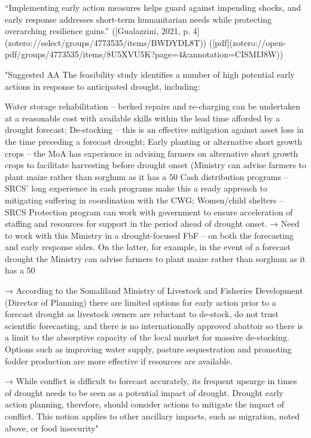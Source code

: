 {{“Implementing early action measures helps guard against impending shocks, and early response addresses short-term humanitarian needs while protecting overarching resilience gains.” ([Gualazzini, 2021, p. 4](zotero://select/groups/4773535/items/BWDYDL8T)) ([pdf](zotero://open-pdf/groups/4773535/items/8U5XVU5K?page=4&annotation=CISMIJ8W))








"Suggested AA
The feasibility study identifies a number of high potential early actions in response to anticipated drought, including:

Water storage rehabilitation – berked repairs and re-charging can be undertaken at a reasonable cost with available skills within the lead time afforded by a drought forecast;
De-stocking – this is an effective mitigation against asset loss in the time preceding a forecast drought;
Early planting or alternative short growth crops – the MoA has experience in advising farmers on alternative short growth crops to facilitate harvesting before drought onset (Ministry can advise farmers to plant maize rather than sorghum as it has a 50%
Cash distribution programs – SRCS’ long experience in cash programs make this a ready approach to mitigating suffering in coordination with the CWG;
Women/child shelters – SRCS Protection program can work with government to ensure acceleration of staffing and resources for support in the period ahead of drought onset.
→ Need to work with this Ministry in a drought-focused FbF – on both the forecasting and early response sides. On the latter, for example, in the event of a forecast drought the Ministry can advise farmers to plant maize rather than sorghum as it has a 50%

→ According to the Somaliland Ministry of Livestock and Fisheries Development (Director of Planning) there are limited options for early action prior to a forecast drought as livestock owners are reluctant to de-stock, do not trust scientific forecasting, and there is no internationally approved abattoir so there is a limit to the absorptive capacity of the local market for massive de-stocking. Options such as improving water supply, pasture sequestration and promoting fodder production are more effective if resources are available.

→ While conflict is difficult to forecast accurately, its frequent upsurge in times of drought needs to be seen as a potential impact of drought. Drought early action planning, therefore, should consider actions to mitigate the impact of conflict. This notion applies to other ancillary impacts, such as migration, noted above, or food insecurity"


}}
